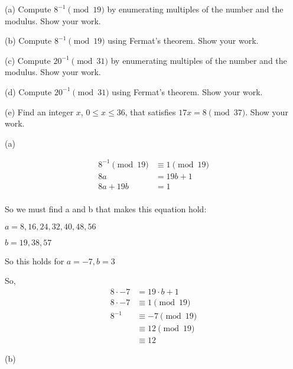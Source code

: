 
\begin{problem}
(a) Compute $8^{-1}\pmod{19}$ by enumerating multiples of the number and the modulus.
Show your work.

\smallskip\noindent
(b) Compute $8^{-1}\pmod{19}$ using Fermat's theorem. Show your work.

\smallskip\noindent
(c) Compute $20^{-1}\pmod{31}$ by enumerating multiples of the number and the modulus.
Show your work.

\smallskip\noindent
(d) Compute $20^{-1}\pmod{31}$ using Fermat's theorem. Show your work.

\smallskip\noindent
(e) Find an integer $x$, $0\le x \le 36$, that satisfies
$17x = 8 \pmod{37}$. Show your work.
\end{problem}

\begin{solution}
(a)

\begin{align*}
8^{-1} \pmod{19} &\equiv 1 \pmod{19}\\
8a &= 19b + 1\\
8a + 19b &= 1\\
\end{align*}
\smallskip\noindent

So we must find a and b that makes this equation hold:

$a = {8, 16, 24, 32, 40, 48, 56}$

$b = {19, 38, 57}$

So this holds for $a=-7, b=3$

So, 
\begin{align*}
8 \cdot -7 &= 19 \cdot b + 1\\
8 \cdot -7 &\equiv 1 \pmod{19}\\
8^{-1} &\equiv -7 \pmod{19}\\
&\equiv 12 \pmod{19}\\
&\equiv 12
\end{align*}

\pagebreak
(b)


\end{solution}
